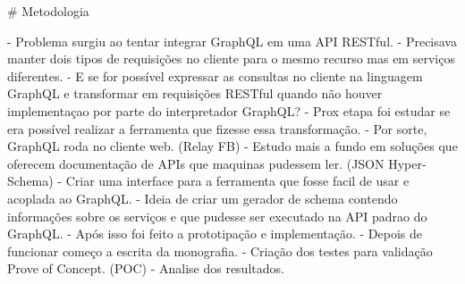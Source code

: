 # Metodologia

- Problema surgiu ao tentar integrar GraphQL em uma API RESTful.
	- Precisava manter dois tipos de requisições no cliente para o mesmo recurso mas em serviços diferentes.
	- E se for possível expressar as consultas no cliente na linguagem GraphQL e transformar em requisições RESTful quando não houver implementaçao por parte do interpretador GraphQL?
- Prox etapa foi estudar se era possível realizar a ferramenta que fizesse essa transformação.
	- Por sorte, GraphQL roda no cliente web. (Relay FB)
- Estudo mais a fundo em soluções que oferecem documentação de APIs que maquinas pudessem ler. (JSON Hyper-Schema)
- Criar uma interface para a ferramenta que fosse facil de usar e acoplada ao GraphQL.
- Ideia de criar um gerador de schema contendo informações sobre os serviços e que pudesse ser executado na API padrao do GraphQL.
- Após isso foi feito a prototipação e implementação.
- Depois de funcionar começo a escrita da monografia.
- Criação dos testes para validação Prove of Concept. (POC)
- Analise dos resultados.
